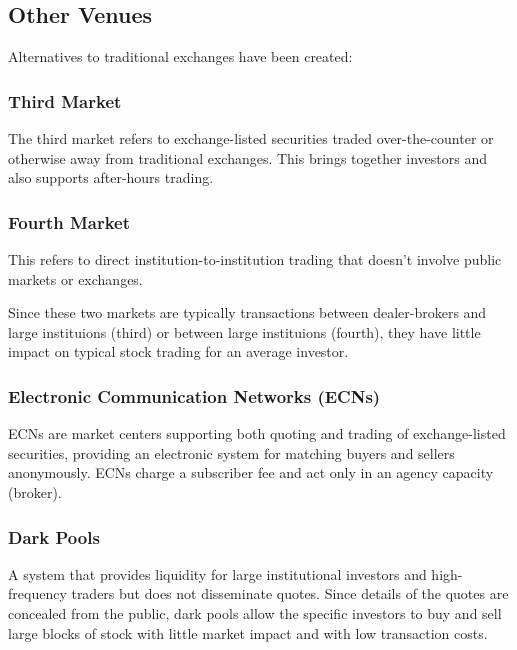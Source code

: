 \bigskip

\subsection{Other Venues}

Alternatives to traditional exchanges have been created:

\subsubsection{Third Market}

The third market refers to exchange-listed securities traded over-the-counter or otherwise away from traditional exchanges. This brings together investors and also supports after-hours trading.

\subsubsection{Fourth Market}

This refers to direct institution-to-institution trading that doesn't involve public markets or exchanges. 

Since these two markets are typically transactions between dealer-brokers and large instituions (third) or between large instituions (fourth), they have little impact on typical stock trading for an average investor. 

\subsubsection{Electronic Communication Networks (ECNs)}

ECNs are market centers supporting both quoting and trading of exchange-listed securities, providing an electronic system for matching buyers and sellers anonymously. ECNs charge a subscriber fee and act only in an agency capacity (broker). 

\subsubsection{Dark Pools}

A system that provides liquidity for large institutional investors and high-frequency traders but does not disseminate quotes. Since details of the quotes are concealed from the public, dark pools allow the specific investors to buy and sell large blocks of stock with little market impact and with low transaction costs. 

